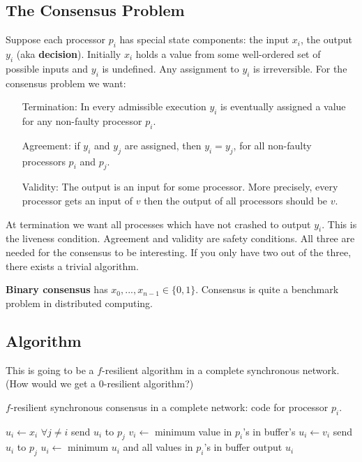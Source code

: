 \documentclass[twoside]{article}
\begin{document}
\subsection{The Consensus Problem}
Suppose each processor $p_i$ has special state components:  the input $x_i$, the output $y_i$ (aka \textbf{decision}). Initially $x_i$ holds a value from some well-ordered set of possible inputs and $y_i$ is undefined. Any assignment to $y_i$ is irreversible. For the consensus problem we want:
\begin{enumerate}
\item[Termination:] In every admissible execution $y_i$ is eventually assigned a value for any non-faulty processor $p_i$.
\item[Agreement:] if $y_i$ and $y_j$ are assigned, then $y_i = y_j$, for all non-faulty processors $p_i$ and $p_j$.
\item[Validity:] The output is an input for some processor. More precisely, every processor gets an input of $v$ then the output of all processors should be $v$.  
\end{enumerate}
At termination we want all processes which have not crashed to output $y_i$. This is the liveness condition. Agreement and validity are safety conditions. All three are needed for the consensus to be interesting. If you only have two out of the three, there exists a trivial algorithm. 

\textbf{Binary consensus} has $x_0, ..., x_{n-1} \in \{0,1\}$. Consensus is quite a benchmark problem in distributed computing. 

\subsection{Algorithm}
This is going to be a $f$-resilient algorithm in a complete synchronous network. (How would we get a $0$-resilient algorithm?)
\begin{algorithm}
	\caption{$f$-resilient synchronous consensus in a complete network: code for processor $p_i$.}
    \label{pseudocode:syncConsensus}
    \begin{algorithmic}[1]
    \State $u_i \leftarrow x_i$
    \State $\forall j \neq i$ send $u_i$ to $p_j$
    	\State $v_i \leftarrow$ minimum value in $p_i$'s in buffer's 
    		\State $u_i \leftarrow v_i$
    			\State send $u_i$ to $p_j$
    		\EndFor
    	\EndIf
    \EndFor
    \State $u_i \leftarrow$ minimum $u_i$ and all values in $p_i$'s in buffer
    \State output $u_i$
    \end{algorithmic}
\end{algorithm}
\end{document}
